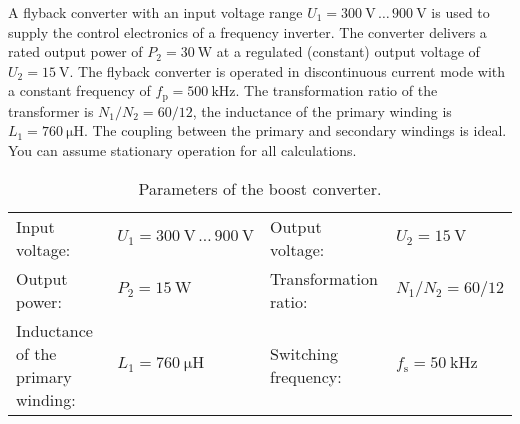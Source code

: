 

A flyback converter with an input voltage range $U_\mathrm{1} = \SI{300}{\volt} \, \dots \, \SI{900}{\volt}$ is used to supply the control electronics of a frequency inverter. The converter delivers a rated output power of  $P_\mathrm{2} = \SI{30}{\watt}$ at a regulated (constant) output voltage of  $U_\mathrm{2} = \SI{15}{\volt}$. The flyback converter is operated in discontinuous current mode with a constant frequency of  $f_\mathrm{p} = \SI{500}{\kilo\hertz}$. The transformation ratio of the transformer is $N_\mathrm{1}/N_\mathrm{2}=60/12$, the inductance of the primary winding is $L_\mathrm{1} = \SI{760}{\micro\henry}$. The coupling between the primary and secondary windings is ideal. You can assume stationary operation for all calculations.



\begin{table}[ht]
    \centering  %
    \begin{tabular}{llll}
        \toprule
        
        Input voltage: &  $U_{\mathrm{1}} = \SI{300}{\volt} \, \dots \, \SI{900}{\volt}$ & Output voltage: & $U_{\mathrm{2}} = \SI{15}{\volt}$ \\ 
        Output power: & $P_2 = \SI{15}{\watt}$  & Transformation ratio: & $N_\mathrm{1}/N_\mathrm{2}=60/12$ \\ 
        Inductance of the primary winding: & $L_\mathrm{1} = \SI{760}{\micro\henry}$ & Switching frequency: & $f_{\mathrm{s}} = \SI{50}{\kilo\hertz}$ \\ 
        \bottomrule
    \end{tabular}
    \caption{Parameters of the boost converter.}  %
    \label{table:ex04_Parameters of the circuit}
\end{table}


